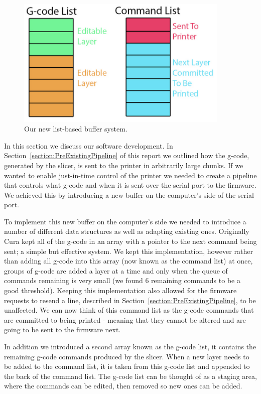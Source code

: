 \documentclass[11pt]{report} %
\begin{document}
\begin{figure}[H]
  \centering
  \includegraphics[width=4in]{james_two_lists.png}
  \caption{Our new list-based buffer system.}
  \label{figure:Jlists}
\end{figure}
In this section we discuss our software development. In Section~\ref{section:PreExistingPipeline} of this report we outlined how the g-code, generated by the slicer, is sent to the printer in arbitrarily large chunks. If we wanted to enable just-in-time control of the printer we needed to create a pipeline that controls what g-code and when it is sent over the serial port to the firmware. We achieved this by introducing a new buffer on the computer’s side of the serial port.

To implement this new buffer on the computer's side we needed to introduce a number of different data structures as well as adapting existing ones. Originally Cura kept all of the g-code in an array with a pointer to the next command being sent; a simple but effective system. We kept this implementation, however rather than adding all g-code into this array (now known as the command list) at once, groups of g-code are added a layer at a time and only when the queue of commands remaining is very small (we found 6 remaining commands to be a good threshold). Keeping this implementation also allowed for the firmware requests to resend a line, described in Section~\ref{section:PreExistingPipeline}, to be unaffected. We can now think of this command list as the g-code commands that are committed to being printed - meaning that they cannot be altered and are going to be sent to the firmware next.

In addition we introduced a second array known as the g-code list, it contains the remaining g-code commands produced by the slicer. When a new layer needs to be added to the command list, it is taken from this g-code list and appended to the back of the command list. The g-code list can be thought of as a staging area, where the commands can be edited, then removed so new ones can be added.
\end{document}
